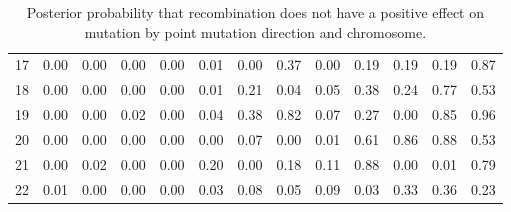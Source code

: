 \documentclass[12pt]{article}%
\begin{document}
\begin{table}[htp!]
\begin{adjustbox}{max width=\textwidth}
\begin{tabular}{ l c c c c c c c c c c c c }
17 &               0.00 &               0.00 &               0.00 &               0.00 &               0.01 &               0.00 &               0.37 &               0.00 &               0.19 &               0.19 &               0.19 &               0.87 \\
18 &               0.00 &               0.00 &               0.00 &               0.00 &               0.01 &               0.21 &               0.04 &               0.05 &               0.38 &               0.24 &               0.77 &               0.53 \\
19 &               0.00 &               0.00 &               0.02 &               0.00 &               0.04 &               0.38 &               0.82 &               0.07 &               0.27 &               0.00 &               0.85 &               0.96 \\
20 &               0.00 &               0.00 &               0.00 &               0.00 &               0.00 &               0.07 &               0.00 &               0.01 &               0.61 &               0.86 &               0.88 &               0.53 \\
21 &               0.00 &               0.02 &               0.00 &               0.00 &               0.20 &               0.00 &               0.18 &               0.11 &               0.88 &               0.00 &               0.01 &               0.79 \\
22 &               0.01 &               0.00 &               0.00 &               0.00 &               0.03 &               0.08 &               0.05 &               0.09 &               0.03 &               0.33 &               0.36 &               0.23 \\
\hline
\end{tabular}
\end{adjustbox}
\caption{Posterior probability that recombination does not have a positive effect on mutation               by point mutation direction and chromosome. }
\label{supp_recombination_chromosomes}
\end{table}



\newpage
\end{document}
